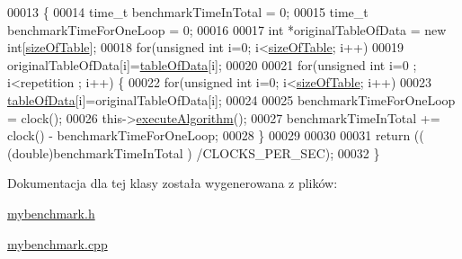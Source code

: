 \begin{DoxyCode}
00013 \{
00014         time\_t benchmarkTimeInTotal = 0;
00015         time\_t benchmarkTimeForOneLoop = 0;
00016 
00017         \textcolor{keywordtype}{int} *originalTableOfData = \textcolor{keyword}{new} \textcolor{keywordtype}{int}[\hyperlink{class_data_frame_aa5d1905c6910cad07ab5189bd34b13ab}{sizeOfTable}];
00018         \textcolor{keywordflow}{for}(\textcolor{keywordtype}{unsigned} \textcolor{keywordtype}{int} i=0; i<\hyperlink{class_data_frame_aa5d1905c6910cad07ab5189bd34b13ab}{sizeOfTable}; i++)
00019                 originalTableOfData[i]=\hyperlink{class_data_frame_a8edc4ce524483e2e5069067267ccdcbf}{tableOfData}[i];
00020 
00021         \textcolor{keywordflow}{for}(\textcolor{keywordtype}{unsigned} \textcolor{keywordtype}{int} i=0 ; i<repetition ; i++)      \{
00022                 \textcolor{keywordflow}{for}(\textcolor{keywordtype}{unsigned} \textcolor{keywordtype}{int} i=0; i<\hyperlink{class_data_frame_aa5d1905c6910cad07ab5189bd34b13ab}{sizeOfTable}; i++)
00023                         \hyperlink{class_data_frame_a8edc4ce524483e2e5069067267ccdcbf}{tableOfData}[i]=originalTableOfData[i];
00024 
00025                 benchmarkTimeForOneLoop = clock();
00026                         this->\hyperlink{class_my_benchmark_aaebbb9785ed7c460e33459464655a611}{executeAlgorithm}();
00027                 benchmarkTimeInTotal += clock() - benchmarkTimeForOneLoop;
00028         \}
00029 
00030 
00031         \textcolor{keywordflow}{return} (( (\textcolor{keywordtype}{double})benchmarkTimeInTotal ) /CLOCKS\_PER\_SEC);
00032 \}
\end{DoxyCode}


Dokumentacja dla tej klasy została wygenerowana z plików\-:\begin{DoxyCompactItemize}
\item 
\hyperlink{mybenchmark_8h}{mybenchmark.\-h}\item 
\hyperlink{mybenchmark_8cpp}{mybenchmark.\-cpp}\end{DoxyCompactItemize}
